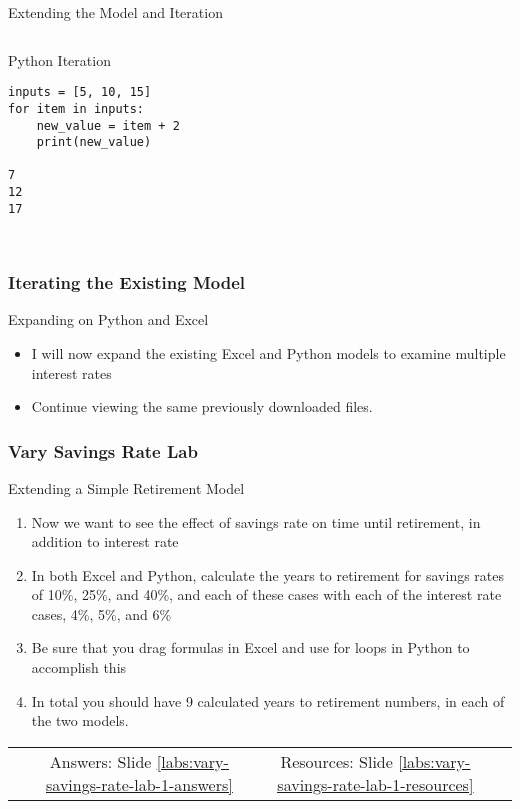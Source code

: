 \documentclass[handout, 11pt]{beamer}
\begin{document}
\begin{section}{Extending the Model and Iteration}
\begin{frame}[fragile]
\begin{columns}
\begin{column}{0.5\textwidth}
{\begin{block}{Python Iteration}
\begin{verbatim}
inputs = [5, 10, 15]
for item in inputs:
    new_value = item + 2
    print(new_value)

7
12
17
        
\end{verbatim}
\end{block}}
\end{column}
\end{columns}
\end{frame}
\begin{frame}
\frametitle{Iterating the Existing Model}
{
\begin{block}{Expanding on Python and Excel}
\begin{itemize}
\item I will now expand the existing Excel and Python models to examine multiple interest rates
\item Continue viewing the same previously downloaded files.
\end{itemize}
\end{block}
}
\end{frame}
\begin{frame}
\frametitle{Vary Savings Rate Lab}
{
\begin{block}{Extending a Simple Retirement Model}
\begin{enumerate}
\item Now we want to see the effect of savings rate on time until retirement, in addition to interest rate
\item In both Excel and Python, calculate the years to retirement for savings rates of 10\%, 25\%, and 40\%, and each of these cases with each of the interest rate cases, 4\%, 5\%, and 6\%
\item Be sure that you drag formulas in Excel and use for loops in Python to accomplish this
\item In total you should have 9 calculated years to retirement numbers, in each of the two models.
\end{enumerate}
\vfill
\begin{tabular*}{\textwidth}{@{\extracolsep{\fill}}cccc}
\toprule
\hfill & Answers: Slide \textcolor{blue}{\underline{\ref{labs:vary-savings-rate-lab-1-answers}}} & Resources: Slide \textcolor{blue}{\underline{\ref{labs:vary-savings-rate-lab-1-resources}}} & \hfill\\

\end{tabular*}
\end{block}
}
\label{labs:vary-savings-rate-lab-1}
\end{frame}
\end{section}
\end{document}
